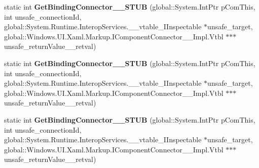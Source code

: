 \begin{DoxyCompactItemize}
static int {\bfseries Get\+Binding\+Connector\+\_\+\+\_\+\+S\+T\+UB} (global\+::\+System.\+Int\+Ptr p\+Com\+This, int unsafe\+\_\+connection\+Id, global\+::\+System.\+Runtime.\+Interop\+Services.\+\_\+\+\_\+vtable\+\_\+\+I\+Inspectable $\ast$unsafe\+\_\+target, global\+::\+Windows.\+U\+I.\+Xaml.\+Markup.\+I\+Component\+Connector\+\_\+\+\_\+\+Impl.\+Vtbl $\ast$$\ast$$\ast$unsafe\+\_\+return\+Value\+\_\+\+\_\+retval)
\item 
\mbox{\label{struct_windows_1_1_u_i_1_1_xaml_1_1_markup_1_1_i_component_connector2_____impl_1_1_vtbl_a8c4d5177a92e6e94d0ed08abe791b629}} 
static int {\bfseries Get\+Binding\+Connector\+\_\+\+\_\+\+S\+T\+UB} (global\+::\+System.\+Int\+Ptr p\+Com\+This, int unsafe\+\_\+connection\+Id, global\+::\+System.\+Runtime.\+Interop\+Services.\+\_\+\+\_\+vtable\+\_\+\+I\+Inspectable $\ast$unsafe\+\_\+target, global\+::\+Windows.\+U\+I.\+Xaml.\+Markup.\+I\+Component\+Connector\+\_\+\+\_\+\+Impl.\+Vtbl $\ast$$\ast$$\ast$unsafe\+\_\+return\+Value\+\_\+\+\_\+retval)
\item 
\mbox{\label{struct_windows_1_1_u_i_1_1_xaml_1_1_markup_1_1_i_component_connector2_____impl_1_1_vtbl_a8c4d5177a92e6e94d0ed08abe791b629}} 
static int {\bfseries Get\+Binding\+Connector\+\_\+\+\_\+\+S\+T\+UB} (global\+::\+System.\+Int\+Ptr p\+Com\+This, int unsafe\+\_\+connection\+Id, global\+::\+System.\+Runtime.\+Interop\+Services.\+\_\+\+\_\+vtable\+\_\+\+I\+Inspectable $\ast$unsafe\+\_\+target, global\+::\+Windows.\+U\+I.\+Xaml.\+Markup.\+I\+Component\+Connector\+\_\+\+\_\+\+Impl.\+Vtbl $\ast$$\ast$$\ast$unsafe\+\_\+return\+Value\+\_\+\+\_\+retval)
\end{DoxyCompactItemize}
